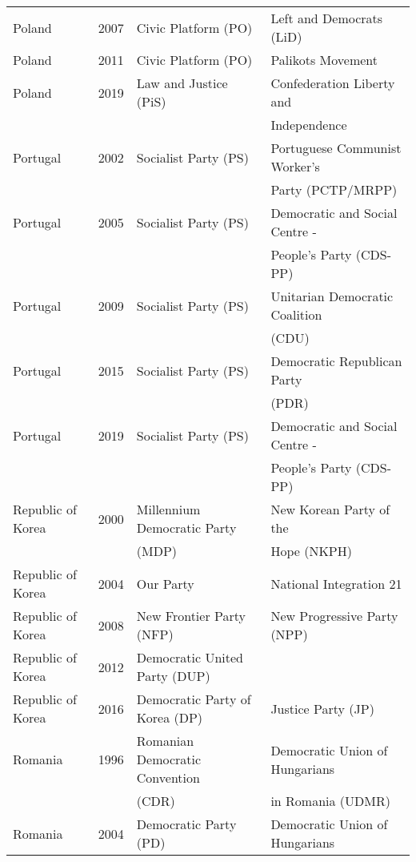 {\begin{longtable}{|l|c|l|l|}
  Poland & 2007 &   Civic Platform (PO) &   Left and Democrats (LiD)  \\ 
  Poland & 2011 &   Civic Platform (PO) &   Palikots Movement \\ 
   Poland & 2019 &   Law and Justice (PiS) &   Confederation Liberty and  \\ 
               &      &         &     Independence  \\ 
   Portugal & 2002 &   Socialist Party (PS) &   Portuguese Communist Worker's \\ 
               &      &         &    Party (PCTP/MRPP)  \\ 
   Portugal & 2005 &   Socialist Party (PS) &   Democratic and Social Centre -  \\ 
               &      &         & People's Party (CDS-PP)    \\ 
  Portugal & 2009 &   Socialist Party (PS) &   Unitarian Democratic Coalition  \\ 
               &      &         &    (CDU)   \\ 
  Portugal & 2015 &   Socialist Party (PS) &   Democratic Republican Party  \\ 
               &      &         &   (PDR)  \\ 
   Portugal & 2019 &   Socialist Party (PS) &   Democratic and Social Centre - \\ 
               &      &         &   People's Party (CDS-PP)   \\ 
   Republic of Korea & 2000 &   Millennium Democratic Party  &   New Korean Party of the \\ 
               &      &      (MDP)   &   Hope (NKPH)   \\ 
   Republic of Korea & 2004 &   Our Party &   National Integration 21 \\ 
   Republic of Korea & 2008 &   New Frontier Party (NFP)   &   New Progressive Party (NPP) \\ 
   Republic of Korea & 2012 &   Democratic United Party (DUP) &  \\ 
   Republic of Korea & 2016 &   Democratic Party of Korea (DP) &   Justice Party (JP) \\ 
   Romania & 1996 &   Romanian Democratic Convention  &   Democratic Union of Hungarians  \\ 
               &      &      (CDR)     &   in Romania (UDMR)  \\ 
   Romania & 2004 &   Democratic Party (PD) &   Democratic Union of Hungarians  \\ 

\end{longtable}}
